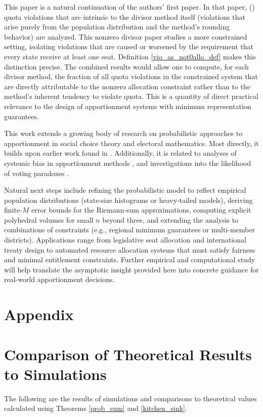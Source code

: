 \documentclass[11pt]{article}
\theoremstyle{definition}
\theoremstyle{definition}
\begin{document}
This paper is a natural continuation of the authors' first paper. In that paper, (\cite{Self}) quota violations that are intrinsic to the divisor method itself (violations that arise purely from the population distribution and the method's rounding behavior) are analyzed. This nonzero divisor paper studies a more constrained setting, isolating violations that are caused or worsened by the requirement that every state receive at least one seat. Definition \ref{vio_as_not0allo_def} makes this distinction precise. The combined results would allow one to compute, for each divisor method, the fraction of all quota violations in the constrained system that are directly attributable to the nonzero allocation constraint rather than to the method's inherent tendency to violate quota. This is a quantity of direct practical relevance to the design of apportionment systems with minimum representation guarantees.

This work extends a growing body of research on probabilistic approaches to apportionment in social choice theory and electoral mathematics. Most directly, it builds upon earlier work found in \cite{Self}. Additionally, it is related to analyses of systemic bias in apportionment methods \parencite{SchusterPukelsheimDrtonDraper2003, SchwingenschloglDrton2004, DrtonSchwingenschlogl2005, Ichimori2012}, and investigations into the likelihood of voting paradoxes \parencite{gehrlein2017elections, pandit-cutrone-fairness-2025}.

Natural next steps include refining the probabilistic model to reflect empirical population distributions (state‑size histograms or heavy‑tailed models), deriving finite‑$M$ error bounds for the Riemann‑sum approximations, computing explicit polyhedral volumes for small $n$ beyond three, and extending the analysis to combinations of constraints (e.g., regional minimum guarantees or multi-member districts). Applications range from legislative seat allocation and international treaty design to automated resource allocation systems that must satisfy fairness and minimal entitlement constraints. Further empirical and computational study will help translate the asymptotic insight provided here into concrete guidance for real-world apportionment decisions.

\newpage
\appendix
\section*{Appendix}
\section{Comparison of Theoretical Results to Simulations}\label{AppA}
The following are the results of simulations and comparisons to theoretical values calculated using Theorems \ref{prob_sum} and \ref{kitchen_sink}.
\end{document}
